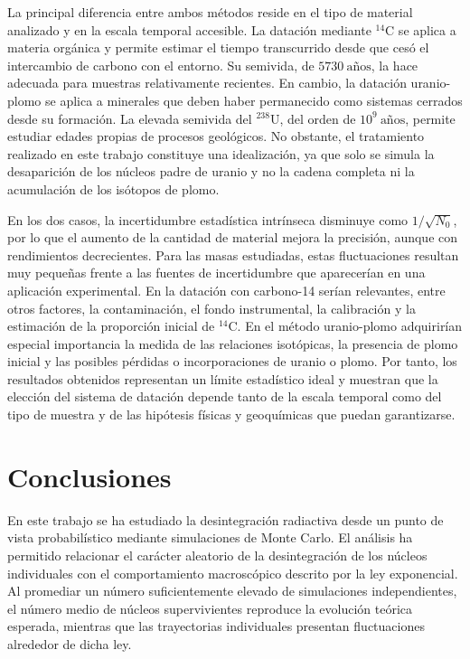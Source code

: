 \documentclass[12pt,a4paper]{article}
\begin{document}
La principal diferencia entre ambos métodos reside en el tipo de material analizado y en la escala temporal accesible. La datación mediante $^{14}\text{C}$ se aplica a materia orgánica y permite estimar el tiempo transcurrido desde que cesó el intercambio de carbono con el entorno. Su semivida, de $5730\ \text{años}$, la hace adecuada para muestras relativamente recientes. En cambio, la datación uranio-plomo se aplica a minerales que deben haber permanecido como sistemas cerrados desde su formación. La elevada semivida del $^{238}\text{U}$, del orden de $10^9\ \text{años}$, permite estudiar edades propias de procesos geológicos. No obstante, el tratamiento realizado en este trabajo constituye una idealización, ya que solo se simula la desaparición de los núcleos padre de uranio y no la cadena completa ni la acumulación de los isótopos de plomo.

En los dos casos, la incertidumbre estadística intrínseca disminuye como $1/\sqrt{N_0}$, por lo que el aumento de la cantidad de material mejora la precisión, aunque con rendimientos decrecientes. Para las masas estudiadas, estas fluctuaciones resultan muy pequeñas frente a las fuentes de incertidumbre que aparecerían en una aplicación experimental. En la datación con carbono-14 serían relevantes, entre otros factores, la contaminación, el fondo instrumental, la calibración y la estimación de la proporción inicial de $^{14}\text{C}$. En el método uranio-plomo adquirirían especial importancia la medida de las relaciones isotópicas, la presencia de plomo inicial y las posibles pérdidas o incorporaciones de uranio o plomo. Por tanto, los resultados obtenidos representan un límite estadístico ideal y muestran que la elección del sistema de datación depende tanto de la escala temporal como del tipo de muestra y de las hipótesis físicas y geoquímicas que puedan garantizarse.



\newpage
\section{Conclusiones}

En este trabajo se ha estudiado la desintegración radiactiva desde un punto de vista probabilístico mediante simulaciones de Monte Carlo. El análisis ha permitido relacionar el carácter aleatorio de la desintegración de los núcleos individuales con el comportamiento macroscópico descrito por la ley exponencial. Al promediar un número suficientemente elevado de simulaciones independientes, el número medio de núcleos supervivientes reproduce la evolución teórica esperada, mientras que las trayectorias individuales presentan fluctuaciones alrededor de dicha ley.
\end{document}
